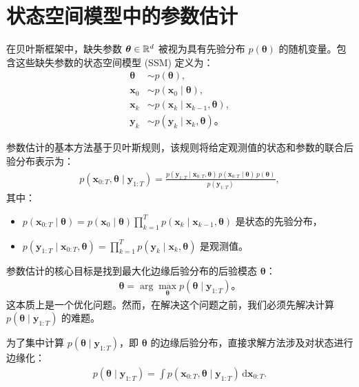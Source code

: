 \section{状态空间模型中的参数估计}
在贝叶斯框架中，缺失参数 \(\boldsymbol{\theta} \in \mathbb{R}^d\) 被视为具有先验分布 \(p(\boldsymbol{\theta})\) 的随机变量。包含这些缺失参数的状态空间模型 (SSM) 定义为：
\begin{align*}
\boldsymbol{\theta} &\sim p(\boldsymbol{\theta}), \\
\mathbf{x}_0 &\sim p(\mathbf{x}_0 \mid \boldsymbol{\theta}), \\
\mathbf{x}_k &\sim p(\mathbf{x}_k \mid \mathbf{x}_{k-1}, \boldsymbol{\theta}), \\
\mathbf{y}_k &\sim p(\mathbf{y}_k \mid \mathbf{x}_k, \boldsymbol{\theta})。
\end{align*}

参数估计的基本方法基于贝叶斯规则，该规则将给定观测值的状态和参数的联合后验分布表示为：
\begin{align*}
p(\mathbf{x}_{0:T}, \boldsymbol{\theta} \mid \mathbf{y}_{1:T}) = \frac{p(\mathbf{y}_{1:T} \mid \mathbf{x}_{0:T}, \boldsymbol{\theta}) \, p(\mathbf{x}_{0:T} \mid \boldsymbol{\theta}) \, p(\boldsymbol{\theta})}{p(\mathbf{y}_{1:T})},
\end{align*}
其中：
\begin{itemize}
\item \(p(\mathbf{x}_{0:T} \mid \boldsymbol{\theta}) = p(\mathbf{x}_0 \mid \boldsymbol{\theta}) \prod_{k=1}^{T} p(\mathbf{x}_k \mid \mathbf{x}_{k-1}, \boldsymbol{\theta})\) 是状态的先验分布，
\item \(p(\mathbf{y}_{1:T} \mid \mathbf{x}_{0:T}, \boldsymbol{\theta}) = \prod_{k=1}^{T} p(\mathbf{y}_k \mid \mathbf{x}_k, \boldsymbol{\theta})\) 是观测值。
\end{itemize}

参数估计的核心目标是找到最大化边缘后验分布的后验模态 \(\boldsymbol{\theta}\)：
\begin{align*}
\boldsymbol{\theta} = \arg \max_{\boldsymbol{\theta}} p(\boldsymbol{\theta} \mid \mathbf{y}_{1:T})。
\end{align*}
这本质上是一个优化问题。然而，在解决这个问题之前，我们必须先解决计算 \(p(\boldsymbol{\theta} \mid \mathbf{y}_{1:T})\) 的难题。

为了集中计算 \(p(\boldsymbol{\theta} \mid \mathbf{y}_{1:T})\)，即 \(\boldsymbol{\theta}\) 的边缘后验分布，直接求解方法涉及对状态进行边缘化：
\begin{align*}
p(\boldsymbol{\theta} \mid \mathbf{y}_{1:T}) = \int p(\mathbf{x}_{0:T}, \boldsymbol{\theta} \mid \mathbf{y}_{1:T}) \, \mathrm{d} \mathbf{x}_{0:T}.
\end{align*}

